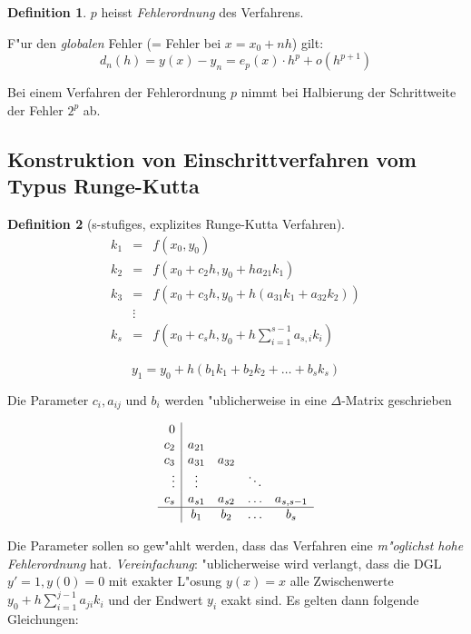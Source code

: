 \documentclass[german, 10pt, a4paper, twocolumn]{scrartcl}
\theoremstyle{definition}
\newtheorem*{definition}{Definition}
\begin{document}
\begin{definition}
	$p$ heisst \textit{Fehlerordnung} des Verfahrens.
\end{definition}

F"ur den \textit{globalen} Fehler (= Fehler bei $x=x_0 + nh$) gilt:
\begin{displaymath}
	d_n(h) = y(x) - y_n = e_p(x)\cdotp h^p + o(h^{p+1})
\end{displaymath}

Bei einem Verfahren der Fehlerordnung $p$ nimmt bei Halbierung der Schrittweite der Fehler $2^p$ ab.


\subsection{Konstruktion von Einschrittverfahren vom Typus Runge-Kutta}

\begin{definition}[s-stufiges, explizites Runge-Kutta Verfahren] \
	\begin{eqnarray*}
		k_1 &	= &	f(x_0, y_0)\\
		k_2 &	= &	f(x_0 + c_2h, y_0 + ha_{21} k_1)\\
		k_3 &	= &	f(x_0 + c_3h, y_0 + h(a_{31} k_1 + a_{32} k_2))\\
		&	\vdots\\
		k_s &	= &	f(x_0 + c_s h, y_0 + h \sum^{s-1}_{i=1} a_{s,i} k_i)
	\end{eqnarray*}

	\begin{displaymath}
		y_1 = y_0 + h(b_1 k_1 + b_2 k_2 + \ldots + b_s k_s)
	\end{displaymath}
\end{definition}

Die Parameter $c_i, a_{ij}$ und $b_i$ werden "ublicherweise in eine $\Delta$-Matrix geschrieben

\begin{displaymath}
	\begin{array}{r|ccccc}
		0\\
		c_2 &		a_{21}\\
		c_3 &		a_{31} &	a_{32}\\
		\vdots &	\vdots &	&		\ddots\\
		c_s &		a_{s1} &	a_{s2} &	\hdots &	a_{s,s-1} \\ \hline
		&		b_1 &		b_2 &		\hdots &	b_s
	\end{array}
\end{displaymath}

Die Parameter sollen so gew"ahlt werden, dass das Verfahren eine \textit{m"oglichst hohe Fehlerordnung} hat. \textit{Vereinfachung}: "ublicherweise wird verlangt, dass die DGL $y'=1, y(0) = 0$ mit exakter L"osung $y(x) = x$ alle Zwischenwerte $y_0 + h \sum^{j-1}_{i=1} a_{ji} k_i$ und der Endwert $y_i$ exakt sind. Es gelten dann folgende Gleichungen:
\end{document}
